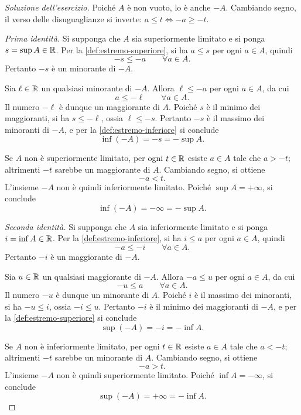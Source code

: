 \begin{proof}[Soluzione dell'esercizio]
Poiché \(A\) è non vuoto, lo è anche \(-A\).
Cambiando segno, il verso delle disuguaglianze si inverte:
\(a\le t\Longleftrightarrow-a\ge-t\).

\emph{Prima identità.}
Si supponga che \(A\) sia superiormente limitato e si ponga
\(s=\sup A\in\mathbb{R}\). Per la \cref{def:estremo-superiore},
si ha \(a\le s\) per ogni \(a\in A\), quindi
\[
  -s\le-a\qquad\forall a\in A.
\]
Pertanto \(-s\) è un minorante di \(-A\).

Sia \(\ell\in\mathbb{R}\) un qualsiasi minorante di \(-A\).
Allora \(\ell\le-a\) per ogni \(a\in A\), da cui
\[
  a\le-\ell\qquad\forall a\in A.
\]
Il numero \(-\ell\) è dunque un maggiorante di \(A\).
Poiché \(s\) è il minimo dei maggioranti, si ha
\(s\le-\ell\), ossia \(\ell\le-s\).
Pertanto \(-s\) è il massimo dei minoranti di \(-A\), e
per la \cref{def:estremo-inferiore} si conclude
\[
  \inf(-A)=-s=-\sup A.
\]

Se \(A\) non è superiormente limitato, per ogni \(t\in\mathbb{R}\)
esiste \(a\in A\) tale che \(a>-t\); altrimenti \(-t\)
sarebbe un maggiorante di \(A\). Cambiando segno, si ottiene
\[
  -a<t.
\]
L'insieme \(-A\) non è quindi inferiormente limitato.
Poiché \(\sup A=+\infty\), si conclude
\[
  \inf(-A)=-\infty=-\sup A.
\]

\emph{Seconda identità.}
Si supponga che \(A\) sia inferiormente limitato e si ponga
\(i=\inf A\in\mathbb{R}\). Per la \cref{def:estremo-inferiore},
si ha \(i\le a\) per ogni \(a\in A\), quindi
\[
  -a\le-i\qquad\forall a\in A.
\]
Pertanto \(-i\) è un maggiorante di \(-A\).

Sia \(u\in\mathbb{R}\) un qualsiasi maggiorante di \(-A\).
Allora \(-a\le u\) per ogni \(a\in A\), da cui
\[
  -u\le a\qquad\forall a\in A.
\]
Il numero \(-u\) è dunque un minorante di \(A\).
Poiché \(i\) è il massimo dei minoranti, si ha
\(-u\le i\), ossia \(-i\le u\).
Pertanto \(-i\) è il minimo dei maggioranti di \(-A\), e
per la \cref{def:estremo-superiore} si conclude
\[
  \sup(-A)=-i=-\inf A.
\]

Se \(A\) non è inferiormente limitato, per ogni \(t\in\mathbb{R}\)
esiste \(a\in A\) tale che \(a<-t\); altrimenti \(-t\)
sarebbe un minorante di \(A\). Cambiando segno, si ottiene
\[
  -a>t.
\]
L'insieme \(-A\) non è quindi superiormente limitato.
Poiché \(\inf A=-\infty\), si conclude
\[
  \sup(-A)=+\infty=-\inf A.
\]
\end{proof}
